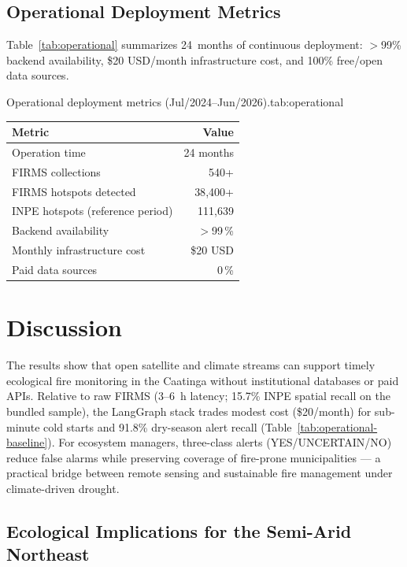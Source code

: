 \documentclass[preprint,12pt,times,numbers]{elsarticle}
\begin{document}
\subsection{Operational Deployment Metrics}
\label{sec:operational-perf}

Table~\ref{tab:operational} summarizes 24~months of continuous deployment: $>$99\% backend availability, \$20 USD/month infrastructure cost, and 100\% free/open data sources.

\begin{resulttable}{Operational deployment metrics (Jul/2024--Jun/2026).}{tab:operational}
\begin{tabular}{@{}lr@{}}
\toprule
\textbf{Metric} & \textbf{Value} \\
\midrule
Operation time & 24 months \\
FIRMS collections & 540+ \\
FIRMS hotspots detected & 38{,}400+ \\
INPE hotspots (reference period) & 111{,}639 \\
Backend availability & $>$99\,\% \\
Monthly infrastructure cost & \$20 USD \\
Paid data sources & 0\,\% \\
\bottomrule
\end{tabular}
\end{resulttable}

\section{Discussion}
\label{sec:discussion}

The results show that open satellite and climate streams can support timely ecological fire monitoring in the Caatinga without institutional databases or paid APIs. Relative to raw FIRMS (3--6~h latency; 15.7\% INPE spatial recall on the bundled sample), the LangGraph stack trades modest cost (\$20/month) for sub-minute cold starts and 91.8\% dry-season alert recall (Table~\ref{tab:operational-baseline}). For ecosystem managers, three-class alerts (YES/UNCERTAIN/NO) reduce false alarms while preserving coverage of fire-prone municipalities --- a practical bridge between remote sensing and sustainable fire management under climate-driven drought.

\subsection{Ecological Implications for the Semi-Arid Northeast}
\end{document}
